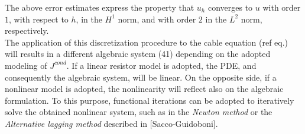 \documentclass[a4paper]{article}
\begin{document}
The above error estimates express the property that $u_h$ converges to $u$ with order $1$, with respect to $h$, in the $H^1$ norm, and with order $2$ in the $L^2$ norm, respectively.\\
The application of this discretization procedure to the cable equation (ref eq.) will results in a different algebraic system (41) depending on the adopted modeling of  $J^{cond}$. If a linear resistor model is adopted, the PDE, and consequently the algebraic system, will be linear. On the opposite side, if a nonlinear model is adopted, the nonlinearity will reflect also on the algebraic formulation. To this purpose, functional iterations can be adopted to iteratively solve the obtained nonlinear system, such as in the \textit{Newton method} or the \textit{Alternative lagging method} described in [Sacco-Guidoboni].
\end{document}
